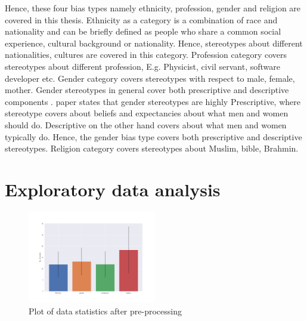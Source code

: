 Hence, these four bias types namely ethnicity, profession, gender and religion are covered in this thesis. Ethnicity as a category is a combination of race and nationality and can be briefly defined as people who share a common social experience, cultural background or nationality\cite{peoples2014humanity}. Hence, stereotypes about different nationalities, cultures are covered in this category. Profession category covers stereotypes about different profession, E.g.  Physicist, civil servant, software developer etc. Gender category covers stereotypes with respect to male, female, mother. Gender stereotypes in general cover both prescriptive and descriptive components \cite{koenig2018comparing}. \cite{prentice2002women} paper states that gender stereotypes are highly Prescriptive, where stereotype covers about beliefs and expectancies about what men and women should do. Descriptive on the other hand covers about what men and women typically do. Hence, the gender bias type covers both prescriptive and descriptive stereotypes. Religion category covers stereotypes about Muslim, bible, Brahmin.

\section{Exploratory data analysis}\label{EDA}

\begin{figure}[h]
    \centering
    \includegraphics[width=0.5\textwidth]{thesis/figures/No_words.png}
    \caption{Plot of data statistics after pre-processing}
    \label{fig:No_words}
\end{figure}

